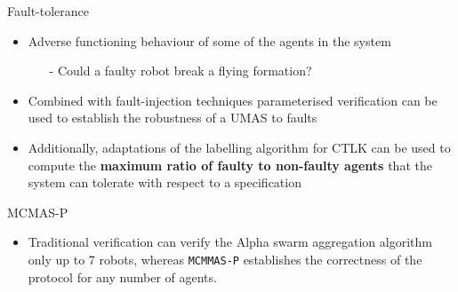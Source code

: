 \documentclass[10pt]{beamer}
\begin{document}

\begin{frame}{Fault-tolerance}

\begin{itemize} \itemsep 2em
        \item Adverse functioning behaviour of some of the agents in the system 
        \begin{itemize}
            \item[\textcolor{black}{-}]Could a faulty robot break a flying formation?
        \end{itemize}
        \item Combined with fault-injection  techniques parameterised verification
    can be used to establish the robustness of a UMAS to faults

        \item Additionally, adaptations of the labelling algorithm for CTLK can
            be used to  compute the {\bf maximum ratio of faulty to non-faulty
            agents} that the system can tolerate with respect to a specification
\end{itemize}

\end{frame}


\begin{frame}{MCMAS-P}

\begin{itemize}
    \item Traditional verification can verify the Alpha swarm aggregation
        algorithm only up to 7 robots, whereas \texttt{MCMMAS-P} establishes
        the correctness of the protocol for any number of agents.
\end{itemize}
\vspace{1em}


\end{frame}
\end{document}
